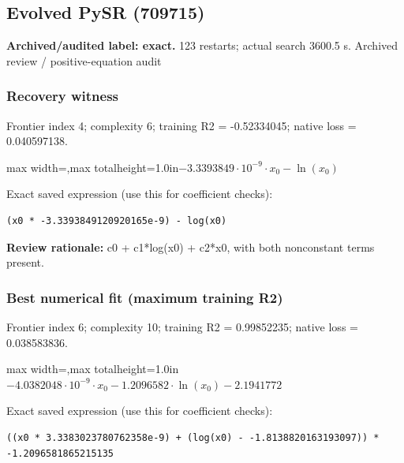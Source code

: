 \documentclass[10pt,letterpaper,landscape]{article}
\begin{document}
\begin{minipage}[t]{0.485\textwidth}
\subsection*{Evolved PySR (709715)}
\textbf{Archived/audited label: exact.} 123 restarts; actual search 3600.5 s.
{\small Archived review / positive-equation audit}
\subsubsection*{Recovery witness}
Frontier index 4; complexity 6; training R2 = -0.52334045; native loss = 0.040597138.
\begin{center}\begin{adjustbox}{max width=\linewidth,max totalheight=1.0in}$\displaystyle - 3.3393849 \cdot 10^{-9} \cdot x_{0} - \ln{\left(x_{0} \right)}$\end{adjustbox}\end{center}
{\scriptsize Exact saved expression (use this for coefficient checks):}
\begin{lstlisting}
(x0 * -3.3393849120920165e-9) - log(x0)
\end{lstlisting}
{\small\textbf{Review rationale:} c0 + c1*log(x0) + c2*x0, with both nonconstant terms present.}
\subsubsection*{Best numerical fit (maximum training R2)}
Frontier index 6; complexity 10; training R2 = 0.99852235; native loss = 0.038583836.
\begin{center}\begin{adjustbox}{max width=\linewidth,max totalheight=1.0in}$\displaystyle - 4.0382048 \cdot 10^{-9} \cdot x_{0} - 1.2096582 \cdot \ln{\left(x_{0} \right)} - 2.1941772$\end{adjustbox}\end{center}
{\scriptsize Exact saved expression (use this for coefficient checks):}
\begin{lstlisting}
((x0 * 3.3383023780762358e-9) + (log(x0) - -1.8138820163193097)) * -1.2096581865215135
\end{lstlisting}
\end{minipage}
\clearpage{}\label{schechter-10006}
\end{document}
